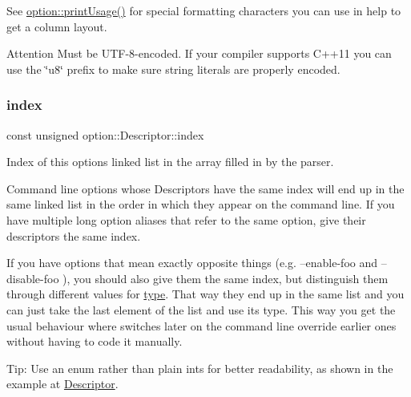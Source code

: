 See \hyperlink{namespaceoption_afc8bb7e040a98a0b33ff1ce9da1be0d1}{option\+::print\+Usage()} for special formatting characters you can use in {\ttfamily help} to get a column layout.

\begin{DoxyAttention}{Attention}
Must be U\+T\+F-\/8-\/encoded. If your compiler supports C++11 you can use the \char`\"{}u8\char`\"{} prefix to make sure string literals are properly encoded. 
\end{DoxyAttention}
\mbox{\label{structoption_1_1Descriptor_a1fee8ac44f529c99ac2b1149b4c391b1}} 
\subsubsection{\texorpdfstring{index}{index}}
{\footnotesize\ttfamily const unsigned option\+::\+Descriptor\+::index}



Index of this option\textquotesingle{}s linked list in the array filled in by the parser. 

Command line options whose Descriptors have the same index will end up in the same linked list in the order in which they appear on the command line. If you have multiple long option aliases that refer to the same option, give their descriptors the same {\ttfamily index}.

If you have options that mean exactly opposite things (e.\+g. {\ttfamily --enable-\/foo} and {\ttfamily --disable-\/foo} ), you should also give them the same {\ttfamily index}, but distinguish them through different values for \hyperlink{structoption_1_1Descriptor_a1b220dabd8aad075fa441a80f9b9343c}{type}. That way they end up in the same list and you can just take the last element of the list and use its type. This way you get the usual behaviour where switches later on the command line override earlier ones without having to code it manually.

\begin{DoxyParagraph}{Tip\+:}
Use an enum rather than plain ints for better readability, as shown in the example at \hyperlink{structoption_1_1Descriptor}{Descriptor}. 
\end{DoxyParagraph}
\mbox{\label{structoption_1_1Descriptor_a470c449dfa894c9bfda2dae026142b4b}} 
